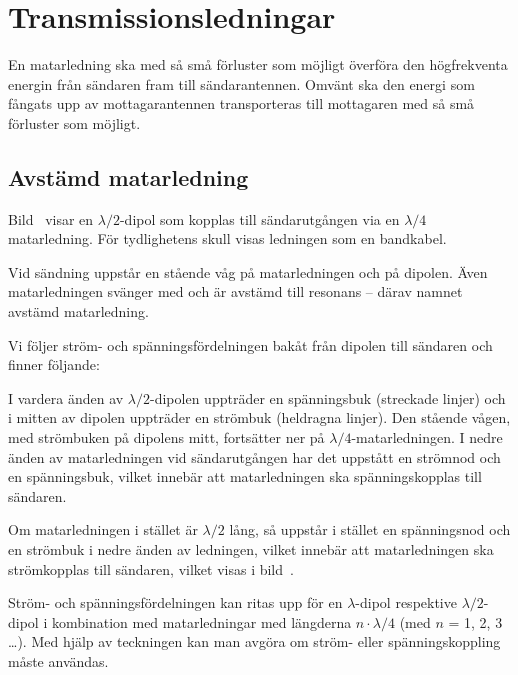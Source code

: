 \section{Transmissionsledningar}
\label{transmissionsledningar}

En matarledning ska med så små förluster som möjligt överföra den
högfrekventa energin från sändaren fram till sändarantennen.
Omvänt ska den energi som fångats upp av mottagarantennen transporteras
till mottagaren med så små förluster som möjligt.

\subsection{Avstämd matarledning}
\label{avstämd_matarledning}


Bild~ visar en \(\lambda/2\)-dipol som kopplas till
sändarutgången via en \(\lambda/4\) matarledning.
För tydlighetens skull visas ledningen som en bandkabel.

Vid sändning uppstår en stående våg på matarledningen och på dipolen.
Även matarledningen svänger med och är avstämd till resonans
-- därav namnet avstämd matarledning.

Vi följer ström- och spänningsfördelningen bakåt från dipolen till
sändaren och finner följande:

I vardera änden av \(\lambda/2\)-dipolen uppträder en spänningsbuk (streckade
linjer) och i mitten av dipolen uppträder en strömbuk (heldragna linjer).
Den stående vågen, med strömbuken på dipolens mitt, fortsätter ner på
\(\lambda/4\)-matarledningen.
I nedre änden av matarledningen vid sändarutgången har det uppstått en strömnod
och en spänningsbuk, vilket innebär att matarledningen ska spänningskopplas
till sändaren.


Om matarledningen i stället är \(\lambda/2\) lång, så uppstår i
stället en spänningsnod och en strömbuk i nedre änden av ledningen,
vilket innebär att matarledningen ska strömkopplas till sändaren,
vilket visas i bild~.

Ström- och spänningsfördelningen kan ritas upp för en \(\lambda\)-dipol
respektive \(\lambda/2\)-dipol i kombination med matarledningar med längderna
\(n \cdot \lambda/4\) (med \(n\) = 1, 2, 3 \dots).
Med hjälp av teckningen kan man avgöra om ström- eller spänningskoppling måste
användas.

